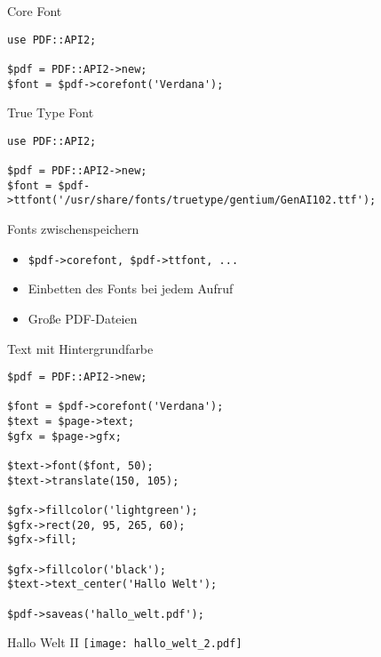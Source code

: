 \begin{frame}[fragile]{Core Font}
\begin{lstlisting}
use PDF::API2;

$pdf = PDF::API2->new;
$font = $pdf->corefont('Verdana');
\end{lstlisting}
\end{frame}


\begin{frame}[fragile]{True Type Font}
\begin{lstlisting}
use PDF::API2;

$pdf = PDF::API2->new;
$font = $pdf->ttfont('/usr/share/fonts/truetype/gentium/GenAI102.ttf');
\end{lstlisting}
\end{frame}

\begin{frame}[fragile]{Fonts zwischenspeichern}
\begin{itemize}
\item \begin{verbatim}$pdf->corefont, $pdf->ttfont, ... \end{verbatim} 
\item Einbetten des Fonts bei jedem Aufruf
\item Große PDF-Dateien
\end{itemize}
\end{frame}

\begin{frame}[fragile]{Text mit Hintergrundfarbe}
\begin{lstlisting}
$pdf = PDF::API2->new;

$font = $pdf->corefont('Verdana');
$text = $page->text;
$gfx = $page->gfx;

$text->font($font, 50);
$text->translate(150, 105);

$gfx->fillcolor('lightgreen');
$gfx->rect(20, 95, 265, 60);
$gfx->fill;

$gfx->fillcolor('black');
$text->text_center('Hallo Welt');

$pdf->saveas('hallo_welt.pdf');
\end{lstlisting}
\end{frame}

\begin{frame}{Hallo Welt II}
\texttt{[image: hallo\_welt\_2.pdf]}
\end{frame}

